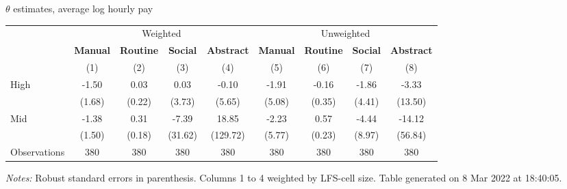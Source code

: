 \begin{center}
\begin{threeparttable}[!h]
\caption{$ \theta $ estimates, average log hourly pay}
\begin{tabular}{lcccccccc}
\toprule
\toprule
& \multicolumn{4}{c}{Weighted} & \multicolumn{4}{c}{Unweighted} \\
&\multicolumn{1}{c}{\textbf{Manual}}&\multicolumn{1}{c}{\textbf{Routine}}&\multicolumn{1}{c}{\textbf{Social}}&\multicolumn{1}{c}{\textbf{Abstract}}&\multicolumn{1}{c}{\textbf{Manual}}&\multicolumn{1}{c}{\textbf{Routine}}&\multicolumn{1}{c}{\textbf{Social}}&\multicolumn{1}{c}{\textbf{Abstract}} \\
\textbf{}&\multicolumn{1}{c}{(1)}&\multicolumn{1}{c}{(2)}&\multicolumn{1}{c}{(3)}&\multicolumn{1}{c}{(4)}&\multicolumn{1}{c}{(5)}&\multicolumn{1}{c}{(6)}&\multicolumn{1}{c}{(7)}&\multicolumn{1}{c}{(8)} \\
\midrule
High                &       -1.50&        0.03&        0.03&       -0.10&       -1.91&       -0.16&       -1.86&       -3.33\\
                    &      (1.68)&      (0.22)&      (3.73)&      (5.65)&      (5.08)&      (0.35)&      (4.41)&     (13.50)\\
Mid                 &       -1.38&        0.31&       -7.39&       18.85&       -2.23&        0.57&       -4.44&      -14.12\\
                    &      (1.50)&      (0.18)&     (31.62)&    (129.72)&      (5.77)&      (0.23)&      (8.97)&     (56.84)\\
Observations        &         380&         380&         380&         380&         380&         380&         380&         380\\
\bottomrule
\bottomrule
\end{tabular}
\begin{tablenotes}
\item \footnotesize \textit{Notes:} Robust standard errors in parenthesis. Columns 1 to 4 weighted by LFS-cell size. Table generated on  8 Mar 2022 at 18:40:05.
\end{tablenotes}
\end{threeparttable}
\end{center}
